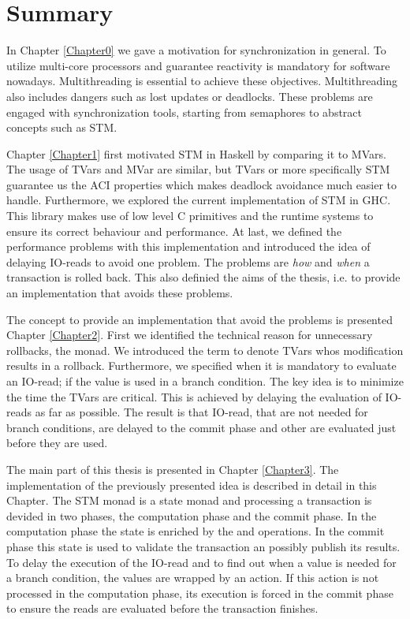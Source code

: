 \section{Summary}
In Chapter \ref{Chapter0} we gave a motivation for synchronization in general. To utilize multi-core
processors and guarantee reactivity is mandatory for software nowadays. Multithreading is essential 
to achieve these objectives. Multithreading also includes dangers such as lost updates or deadlocks. 
These problems are engaged with synchronization tools, starting from semaphores to abstract concepts
such as STM.

Chapter \ref{Chapter1} first motivated STM in Haskell by comparing it to MVars. The usage of TVars 
and MVar are similar, but TVars or more specifically STM guarantee us the ACI properties which makes
deadlock avoidance much easier to handle. Furthermore, we explored the current implementation of STM
in GHC. This library makes use of low level C primitives and the runtime systems to ensure its 
correct behaviour and performance. At last, we defined the performance problems with this implementation
and introduced the idea of delaying IO-reads to avoid one problem. The problems are \textit{how} and 
\textit{when} a transaction is rolled back. This also definied the aims of the thesis, i.e. 
to provide an implementation that avoids these problems. 

The concept to provide an implementation that avoid the problems is presented Chapter \ref{Chapter2}.
First we identified the technical reason for unnecessary rollbacks, the monad. We introduced the term
 to denote TVars whos modification results in a rollback. Furthermore, we 
specified when it is mandatory to evaluate an IO-read; if the value is used in a branch condition.
The key idea is to minimize the time the TVars are critical. This is achieved by delaying the 
evaluation of IO-reads as far as possible. The result is that IO-read, that are not needed for branch 
conditions, are delayed to the commit phase and other are evaluated just before they are used.

The main part of this thesis is presented in Chapter \ref{Chapter3}. The implementation of the previously 
presented idea is described in detail in this Chapter. The STM monad is a state monad and processing a
transaction is devided in two phases, the computation phase and the commit phase. In the computation
phase the state is enriched by the  and  operations. In the commit phase 
this state is used to validate the transaction an possibly publish its results. To delay the execution 
of the IO-read and to find out when a value is needed for a branch condition, the values are wrapped 
by an  action. If this action is not processed in the computation phase, its 
execution is forced in the commit phase to ensure the reads are evaluated before the transaction 
finishes. 

